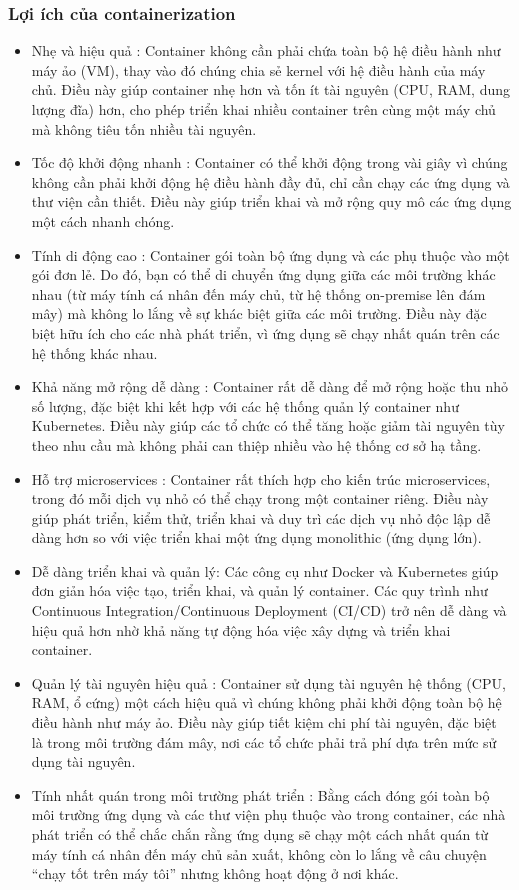 \documentclass[a4paper,12pt]{article}
\begin{document}
\subsubsection{ Lợi ích của containerization}
\begin{itemize}
    \item Nhẹ và hiệu quả :
Container không cần phải chứa toàn bộ hệ điều hành như máy ảo (VM), thay vào đó chúng chia sẻ kernel với hệ điều hành của máy chủ. Điều này giúp container nhẹ hơn và tốn ít tài nguyên (CPU, RAM, dung lượng đĩa) hơn, cho phép triển khai nhiều container trên cùng một máy chủ mà không tiêu tốn nhiều tài nguyên.
\item Tốc độ khởi động nhanh :
Container có thể khởi động trong vài giây vì chúng không cần phải khởi động hệ điều hành đầy đủ, chỉ cần chạy các ứng dụng và thư viện cần thiết. Điều này giúp triển khai và mở rộng quy mô các ứng dụng một cách nhanh chóng.
\item Tính di động cao :
Container gói toàn bộ ứng dụng và các phụ thuộc vào một gói đơn lẻ. Do đó, bạn có thể di chuyển ứng dụng giữa các môi trường khác nhau (từ máy tính cá nhân đến máy chủ, từ hệ thống on-premise lên đám mây) mà không lo lắng về sự khác biệt giữa các môi trường.
Điều này đặc biệt hữu ích cho các nhà phát triển, vì ứng dụng sẽ chạy nhất quán trên các hệ thống khác nhau.
\item  Khả năng mở rộng dễ dàng :
Container rất dễ dàng để mở rộng hoặc thu nhỏ số lượng, đặc biệt khi kết hợp với các hệ thống quản lý container như Kubernetes. Điều này giúp các tổ chức có thể tăng hoặc giảm tài nguyên tùy theo nhu cầu mà không phải can thiệp nhiều vào hệ thống cơ sở hạ tầng.
\item Hỗ trợ microservices :
Container rất thích hợp cho kiến trúc microservices, trong đó mỗi dịch vụ nhỏ có thể chạy trong một container riêng. Điều này giúp phát triển, kiểm thử, triển khai và duy trì các dịch vụ nhỏ độc lập dễ dàng hơn so với việc triển khai một ứng dụng monolithic (ứng dụng lớn).
\item  Dễ dàng triển khai và quản lý:
Các công cụ như Docker và Kubernetes giúp đơn giản hóa việc tạo, triển khai, và quản lý container. Các quy trình như Continuous Integration/Continuous Deployment (CI/CD) trở nên dễ dàng và hiệu quả hơn nhờ khả năng tự động hóa việc xây dựng và triển khai container.
\item Quản lý tài nguyên hiệu quả :
Container sử dụng tài nguyên hệ thống (CPU, RAM, ổ cứng) một cách hiệu quả vì chúng không phải khởi động toàn bộ hệ điều hành như máy ảo. Điều này giúp tiết kiệm chi phí tài nguyên, đặc biệt là trong môi trường đám mây, nơi các tổ chức phải trả phí dựa trên mức sử dụng tài nguyên.
\item Tính nhất quán trong môi trường phát triển :
Bằng cách đóng gói toàn bộ môi trường ứng dụng và các thư viện phụ thuộc vào trong container, các nhà phát triển có thể chắc chắn rằng ứng dụng sẽ chạy một cách nhất quán từ máy tính cá nhân đến máy chủ sản xuất, không còn lo lắng về câu chuyện “chạy tốt trên máy tôi” nhưng không hoạt động ở nơi khác.
\end{itemize}
\end{document}
